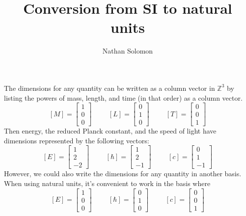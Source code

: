 \documentclass[12pt]{article}
\begin{document}
\title{Conversion from SI to natural units}
\author{Nathan Solomon}
\maketitle

The dimensions for any quantity can be written as a column vector in $ \mathbb{Z}^3$ by listing the powers of mass, length, and time (in that order) as a column vector.
\[ [M] = \begin{bmatrix}
    1 \\
    0 \\
    0
\end{bmatrix} \hspace{1cm}
[L] = \begin{bmatrix}
    0 \\
    1 \\
    0
\end{bmatrix} \hspace{1cm}
[T] = \begin{bmatrix}
    0 \\
    0 \\
    1
\end{bmatrix}\]
Then energy, the reduced Planck constant, and the speed of light have dimensions represented by the following vectors:
\[ [E] = \begin{bmatrix}
    1 \\
    2 \\
    -2
\end{bmatrix} \hspace{1cm}
[\hbar] = \begin{bmatrix}
    1 \\
    2 \\
    -1
\end{bmatrix} \hspace{1cm}
[c] = \begin{bmatrix}
    0 \\
    1 \\
    -1
\end{bmatrix}\]
However, we could also write the dimensions for any quantity in another basis. When using natural units, it's convenient to work in the basis where
\[ [E] = \begin{bmatrix}
    1 \\
    0 \\
    0
\end{bmatrix} \hspace{1cm}
[\hbar] = \begin{bmatrix}
    0 \\
    1 \\
    0
\end{bmatrix} \hspace{1cm}
[c] = \begin{bmatrix}
    0 \\
    0 \\
    1
\end{bmatrix}\]
\end{document}
